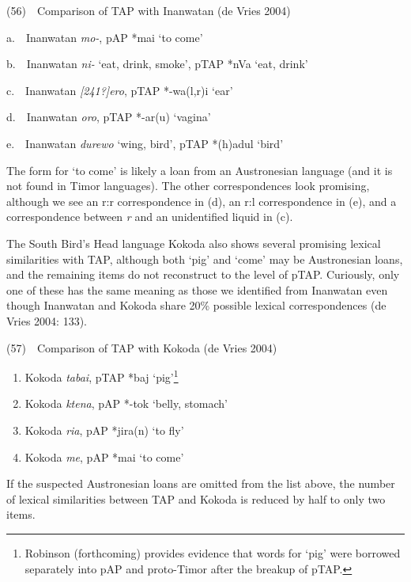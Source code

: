 (56)\ \ Comparison of TAP with Inanwatan (de Vries 2004)

a.\ \ Inanwatan \textit{mo-}, pAP *mai {\textquoteleft}to come{\textquoteright}

b.\ \ Inanwatan \textit{ni- }{\textquoteleft}eat, drink, smoke{\textquoteright}, pTAP *nVa {\textquoteleft}eat, drink{\textquoteright}

c.\ \ Inanwatan \textit{[241?]}\textit{ero}, pTAP *-wa(l,r)i {\textquoteleft}ear{\textquoteright}

d.\ \ Inanwatan \textit{oro}, pTAP *-ar(u) {\textquoteleft}vagina{\textquoteright}

e.\ \ Inanwatan \textit{durewo} {\textquoteleft}wing, bird{\textquoteright}, pTAP *(h)adul {\textquoteleft}bird{\textquoteright}

The form for {\textquoteleft}to come{\textquoteright} is likely a loan from an Austronesian language (and it is not found in Timor languages). The other correspondences look promising, although we see an r:r correspondence in (d), an r:l correspondence in (e), and a correspondence between \textit{r} and an unidentified liquid in (c). 

The South Bird{\textquoteright}s Head language Kokoda also shows several promising lexical similarities with TAP, although both {\textquoteleft}pig{\textquoteright} and {\textquoteleft}come{\textquoteright} may be Austronesian loans, and the remaining items do not reconstruct to the level of pTAP. Curiously, only one of these has the same meaning as those we identified from Inanwatan even though Inanwatan and Kokoda share 20\% possible lexical correspondences (de Vries 2004: 133). 

(57)\ \ Comparison of TAP with Kokoda (de Vries 2004)

\begin{enumerate}
\item Kokoda \textit{ta{\textprimstress}bai}, pTAP *baj {\textquoteleft}pig{\textquoteright}\footnote{ Robinson (forthcoming) provides evidence that words for {\textquoteleft}pig{\textquoteright} were borrowed separately into pAP and proto-Timor after the breakup of pTAP.}
\item Kokoda \textit{k{\textopeno}{\textprimstress}tena}, pAP *-tok {\textquoteleft}belly, stomach{\textquoteright}
\item Kokoda \textit{{\textprimstress}{\textbardotlessj}{\textepsilon}ria}, pAP *jira(n) {\textquoteleft}to fly{\textquoteright}
\item Kokoda \textit{m{\textopeno}e}, pAP *mai {\textquoteleft}to come{\textquoteright}
\end{enumerate}
If the suspected Austronesian loans are omitted from the list above, the number of lexical similarities between TAP and Kokoda is reduced by half to only two items.

